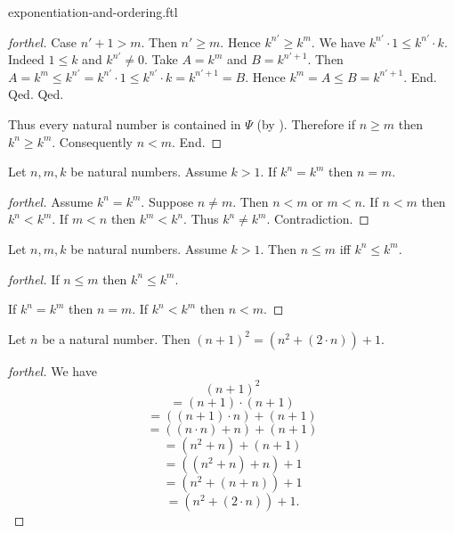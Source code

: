 \documentclass{naproche-library}
\begin{document}
\begin{smodule}{exponentiation-and-ordering.ftl}
\begin{proof}[forthel]
          Case $n' + 1 > m$.
            Then $n' \geq m$.
            Hence $k^{n'} \geq k^{m}$.
            We have $k^{n'} \cdot 1 \leq k^{n'} \cdot k$.
            Indeed $1 \leq k$ and $k^{n'} \neq 0$.
            Take $A = k^{m}$ and $B = k^{n' + 1}$. %
            Then $A
              = k^{m}
              \leq k^{n'}
              = k^{n'} \cdot 1
              \leq k^{n'} \cdot k
              = k^{n' + 1}
              = B$.
            Hence $k^{m} = A \leq B = k^{n' + 1}$.
          End.
        Qed.
      Qed.

      Thus every natural number is contained in $\Psi$ (by ).
      Therefore if $n \geq m$ then $k^{n} \geq k^{m}$.
      Consequently $n < m$.
    End.
  \end{proof}

  \begin{corollary}[forthel,id=ARITHMETIC_09_6780506905509888]
    Let $n, m, k$ be natural numbers.
    Assume $k > 1$.
    If $k^{n} = k^{m}$ then $n = m$.
  \end{corollary}
  \begin{proof}[forthel]
    Assume $k^{n} = k^{m}$.
    Suppose $n \neq m$.
    Then $n < m$ or $m < n$.
    If $n < m$ then $k^{n} < k^{m}$.
    If $m < n$ then $k^{m} < k^{n}$.
    Thus $k^{n} \neq k^{m}$.
    Contradiction.
  \end{proof}

  \begin{corollary}[forthel,id=ARITHMETIC_09_2876620253691904]
    Let $n, m, k$ be natural numbers.
    Assume $k > 1$.
    Then $n \leq m$ iff $k^{n} \leq k^{m}$.
  \end{corollary}
  \begin{proof}[forthel]
    If $n \leq m$ then $k^{n} \leq k^{m}$.

    If $k^{n} = k^{m}$ then $n = m$.
    If $k^{n} < k^{m}$ then $n < m$.
  \end{proof}

  \begin{proposition}[forthel,id=ARITHMETIC_09_6984104377581568]
    Let $n$ be a natural number.
    Then $(n + 1)^{2} = (n^{2} + (2 \cdot n)) + 1$.
  \end{proposition}
  \begin{proof}[forthel]
    We have
    \[  (n + 1)^{2}                       \]
    \[    = (n + 1) \cdot (n + 1)         \]
    \[    = ((n + 1) \cdot n) + (n + 1)   \]
    \[    = ((n \cdot n) + n) + (n + 1)   \]
    \[    = (n^{2} + n) + (n + 1)         \]
    \[    = ((n^{2} + n) + n) + 1         \]
    \[    = (n^{2} + (n + n)) + 1         \]
    \[    = (n^{2} + (2 \cdot n)) + 1.    \]
  \end{proof}


\end{smodule}
\end{document}
